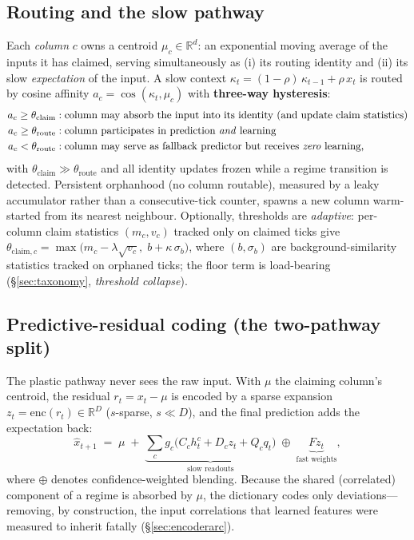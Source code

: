 \documentclass[11pt]{article}
\begin{document}
\subsection{Routing and the slow pathway}
Each \emph{column} $c$ owns a centroid $\mu_c \in \mathbb{R}^d$: an
exponential moving average of the inputs it has claimed, serving
simultaneously as (i) its routing identity and (ii) its slow
\emph{expectation} of the input. A slow context $\kappa_t = (1-\rho)\,
\kappa_{t-1} + \rho\, x_t$ is routed by cosine affinity
$a_c = \cos(\kappa_t, \mu_c)$ with \textbf{three-way hysteresis}:
\begin{align}
a_c \ge \theta_{\mathrm{claim}} &: \text{column may absorb the input into
its identity (and update claim statistics)}\nonumber\\
a_c \ge \theta_{\mathrm{route}} &: \text{column participates in prediction
\emph{and} learning}\nonumber\\
a_c < \theta_{\mathrm{route}} &: \text{column may serve as fallback
predictor but receives \emph{zero} learning,}\nonumber
\end{align}
with $\theta_{\mathrm{claim}} \gg \theta_{\mathrm{route}}$ and all identity
updates frozen while a regime transition is detected. Persistent orphanhood
(no column routable), measured by a leaky accumulator rather than a
consecutive-tick counter, spawns a new column warm-started from its nearest
neighbour. Optionally, thresholds are \emph{adaptive}: per-column claim
statistics $(m_c, v_c)$ tracked only on claimed ticks give
$\theta_{\mathrm{claim},c} = \max\!\big(m_c - \lambda\sqrt{v_c},\;
b + \kappa\,\sigma_b\big)$, where $(b,\sigma_b)$ are background-similarity
statistics tracked on orphaned ticks; the floor term is load-bearing
(\S\ref{sec:taxonomy}, \emph{threshold collapse}).

\subsection{Predictive-residual coding (the two-pathway split)}
The plastic pathway never sees the raw input. With $\mu$ the claiming
column's centroid, the residual $r_t = x_t - \mu$ is encoded by a sparse
expansion $z_t = \mathrm{enc}(r_t) \in \mathbb{R}^{D}$ ($s$-sparse,
$s \ll D$), and the final prediction adds the expectation back:
\begin{equation}
\hat{x}_{t+1} \;=\; \mu \;+\; \underbrace{\textstyle\sum_{c} g_c \big(
C_c h^c_t + D_c z_t + Q_c q_t \big)}_{\text{slow readouts}}
\;\oplus\; \underbrace{F z_t}_{\text{fast weights}},
\end{equation}
where $\oplus$ denotes confidence-weighted blending. Because the shared
(correlated) component of a regime is absorbed by $\mu$, the dictionary
codes only deviations---removing, by construction, the input correlations
that learned features were measured to inherit fatally
(\S\ref{sec:encoderarc}).
\end{document}
